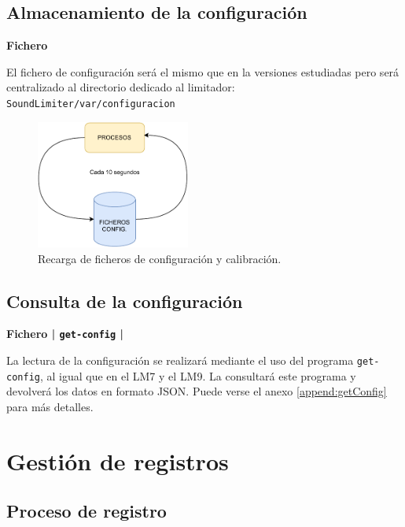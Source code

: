 \subsection{Almacenamiento de la configuración}

\begin{flushright}
\textbf{Fichero}
\end{flushright}

El fichero de configuración será el mismo que en la versiones estudiadas pero será centralizado al directorio dedicado al limitador: \texttt{SoundLimiter/var/configuracion}

\begin{figure}[h]
    \centering
    \includegraphics[width=0.45\textwidth]{figuras/lms-conf-reload.pdf}
    \caption{Recarga de ficheros de configuración y calibración.}
    \label{fig:lms-conf-reload}
\end{figure}

\subsection{Consulta de la configuración}

\begin{flushright}
\textbf{Fichero | \texttt{get-config} | }
\end{flushright}

La lectura de la configuración se realizará mediante el uso del programa \texttt{get-config}, al igual que en el \acrshort{LM7} y el \acrshort{LM9}. La  consultará este programa y devolverá los datos en formato \acrshort{JSON}. Puede verse el anexo \ref{append:getConfig} para más detalles.

\section{Gestión de registros}

\subsection{Proceso de registro}

